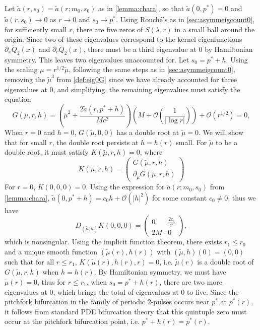 \documentclass[10pt,reqno]{amsart}
\theoremstyle{plain}
\theoremstyle{definition}
\theoremstyle{remark}
\numberwithin{theorem}{section}
\numberwithin{equation}{section}
\begin{document}
Let $\tilde{a}(r, s_0) = \tilde{a}(r; m_0, s_0)$ as in \cref{lemma:chara}, so that $\tilde{a}(0, p^*) = 0$ and $\tilde{a}(r, s_0) \rightarrow 0$ as $r \rightarrow 0$ and $s_0 \rightarrow p^*$. Using Rouch\'{e}'s as in \cref{sec:asymmeigcount0}, for sufficiently small $r$, there are five zeros of $S(\lambda, r)$ in a small ball around the origin. Since two of these eigenvalues correspond to the kernel eigenfunctions $\partial_x \tilde{Q}_2(x)$ and $\partial_c \tilde{Q}_2(x)$, there must be a third eigenvalue at 0 by Hamiltonian symmetry. This leaves two eigenvalues unaccounted for. Let $s_0 = p^* + h$. Using the scaling $\mu = r^{1/2} \tilde{\mu}$, following the same steps as in \cref{sec:asymmeigcount0}, removing the $\tilde{\mu}^3$ from \cref{def:eig0G} since we have already accounted for three eigenvalues at 0, and simplifying, the remaining eigenvalues must satisfy the equation
\begin{equation}\label{def:symmG}
G(\tilde{\mu}, r, h) = \left( \tilde{\mu}^2 + \frac{2 \tilde{a}(r, p^* + h)}{M c^2} \right)
\left( M + \mathcal{O}\left(\frac{1}{|\log r|} \right) \right)
 + \mathcal{O}\left( r^{1/2} \right) = 0,
\end{equation}
When $r = 0$ and $h = 0$, $G(\tilde{\mu}, 0, 0)$ has a double root at $\tilde{\mu} = 0$. We will show that for small $r$, the double root persists at $h = h(r)$ small. For $\tilde{\mu}$ to be a double root, it must satisfy $K(\tilde{\mu}, r, h) = 0$, where
\begin{equation*}
K(\tilde{\mu}, r, h) = 
\begin{pmatrix}G(\tilde{\mu}, r, h) \\ \partial_{\tilde{\mu}}G(\tilde{\mu}, r, h) \end{pmatrix} 
\end{equation*}
For $r = 0$, $K(0, 0, 0) = 0$. Using the expression for $\tilde{a}(r; m_0, s_0)$ from \cref{lemma:chara}, $\tilde{a}(0, p^* + h) = c_0 h + \mathcal{O}(|h|^2)$ for some constant $c_0 \neq 0$, thus we have
\begin{equation*}
D_{(\tilde{\mu}, h)}K(0, 0, 0) = 
\begin{pmatrix}
0 & \frac{2 c_1}{c^2} \\
2M & 0
\end{pmatrix},
\end{equation*}
which is nonsingular. Using the implicit function theorem, there exists $r_1 \leq r_0$ and a unique smooth function $(\tilde{\mu}(r), h(r))$ with $(\tilde{\mu}, h)(0) = (0, 0)$ such that for all $r \leq r_1$, $K(\tilde{\mu}(r), h(r), r) = 0$, i.e. $\tilde{\mu}(r)$ is a double root of $G(\tilde{\mu}, r, h)$ when $h = h(r)$. By Hamiltonian symmetry, we must have $\tilde{\mu}(r) = 0$, thus for $r \leq r_1$, when $s_0 = p^* + h(r)$, there are two more eigenvalues at 0, which brings the total of eigenvalues at 0 to five. Since the pitchfork bifurcation in the family of periodic 2-pulses occurs near $p^*$ at $p^*(r)$, it follows from standard PDE bifurcation theory that this quintuple zero must occur at the pitchfork bifurcation point, i.e. $p^* + h(r) = p^*(r)$.




\end{document}
